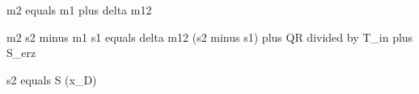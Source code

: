 m2 equals m1 plus delta m12  

m2 s2 minus m1 s1 equals delta m12 (s2 minus s1) plus QR divided by T_in plus S_erz  

s2 equals S (x_D)